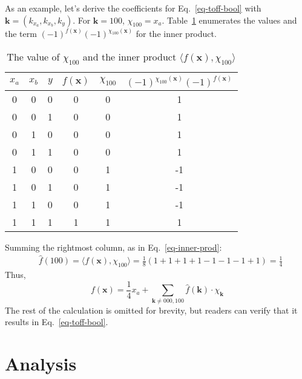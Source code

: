 \documentclass[a4paper]{article}
\begin{document}
\begin{example}
As an example, let's derive the coefficients for Eq.~\ref{eq-toff-bool} with $\mathbf{k} = (k_{x_a}, k_{x_b}, k_y)$.
For $\mathbf{k} = 100$, $\chi_{100} = x_a$. Table~\ref{table-ex-100} enumerates the values and the term $(-1)^{f(\mathbf{x})} (-1)^{\chi_{100}(\mathbf{x})}$ for the inner product.
\begin{table}[h]
  \begin{center}
    \begin{tabular}{c|c|c|c|c|c}
      \hline
      $x_a$ & $x_b$ & $y$ & $f(\mathbf{x})$ & $\chi_{100}$ & $(-1)^{\chi_{100}(\mathbf{x})} (-1)^{f(\mathbf{x})}$ \\\hline
      0 & 0 & 0 & 0 & 0 & 1\\\hline
      0 & 0 & 1 & 0 & 0 & 1\\\hline
      0 & 1 & 0 & 0 & 0 & 1\\\hline
      0 & 1 & 1 & 0 & 0 & 1\\\hline
      1 & 0 & 0 & 0 & 1 & -1\\\hline
      1 & 0 & 1 & 0 & 1 & -1\\\hline
      1 & 1 & 0 & 0 & 1 & -1\\\hline      
      1 & 1 & 1 & 1 & 1 & 1\\\hline
    \end{tabular}
    \caption{The value of $\chi_{100}$ and the inner product $\langle f(\mathbf{x}), \chi_{100} \rangle$}
    \label{table-ex-100}
  \end{center}
\end{table}

Summing the rightmost column, as in Eq.~\ref{eq-inner-prod}:
\begin{align}
    &\hat{f}(100) = \langle f(\mathbf{x}), \chi_{100} \rangle = \frac{1}{8} ( 1 + 1 + 1 + 1 - 1 - 1 - 1 + 1 ) = \frac{1}{4}
\end{align}
Thus,
\begin{equation}
  f(\mathbf{x}) = \frac{1}{4}x_a + \sum_{\mathbf{k} \neq 000,100} \hat{f}(\mathbf{k}) \cdot \chi_{\mathbf{k}}
\end{equation}
The rest of the calculation is omitted for brevity, but readers can verify that it results in Eq.~\ref{eq-toff-bool}.
\end{example}

\vspace{0.4cm}

\section{Analysis}
\end{document}
